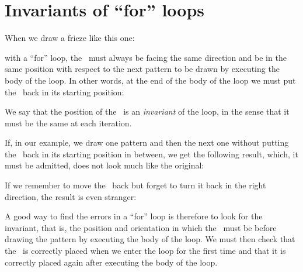 

\section{Invariants of ``for'' loops}

When we draw a frieze like this one:\\[9mm]
%
\vspace*{-9mm}%

\noindent with a ``for'' loop, the \robot\ must always be facing
the same direction
and be in the same position with respect to the next pattern to be
drawn by executing
the body of the loop. In other words, at the end of the body of the
loop we must
put the \robot\ back in its starting position:

We say that the position of the \robot\ is an {\em invariant} of the loop, in the sense
that it must be the same at each iteration.

If, in our example, we draw one pattern and then the next one without putting
the \robot\ back in its starting position in between, we get the following result, which,
it must be admitted, does not look much like the original:\\[5cm]
%
\vspace*{-5cm}


If we remember to move the \robot\ back but forget to turn it
back in the right direction, the result is even stranger:

\noindent\begin{minipage}{\linewidth}
\vspace*{25mm}
%
\vspace*{-25mm}

\end{minipage}

A good way to find the errors in a ``for'' loop is therefore
to look for the invariant, that is, the position and orientation in
which the \robot\ must be before drawing the pattern by
executing the body of the loop. We must then check that the \robot\ is
correctly placed when we enter the loop for the first time
and that it is correctly placed again after executing the body of the loop.

